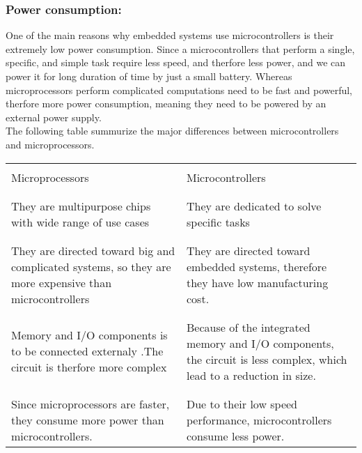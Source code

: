 \documentclass[12pt]{article}
\begin{document}
\subsubsection{Power consumption:}
One of the main reasons why embedded systems use microcontrollers is their extremely low power consumption. Since a microcontrollers that perform a single, specific, and simple task require less speed, and therfore less power, and we can power it for long duration of time by just a small battery.
Whereas microprocessors perform complicated computations need to be fast and powerful, therfore more power consumption, meaning they need to be powered by an external power supply.\\
The following table summurize the major differences between microcontrollers and microprocessors.
\begin{table}[ht]
    \centering
    \begin{tabular}{|p{0.5\linewidth}|p{0.5\linewidth}|}
        \hline
        \\[0.06em]
        Microprocessors                                                                                        & Microcontrollers                                                                                                     \\
        \\[0.06em]
        \hline
        \hline
        \\[0.06em]
        They are multipurpose chips with wide range of use cases                                               & They are dedicated to solve specific tasks                                                                           \\
        \\[0.06em]
        \hline
        \\[0.06em]
        They are directed toward big and complicated systems, so they are more expensive than microcontrollers & They are directed toward embedded systems, therefore they have low manufacturing cost.                               \\
        \\[0.06em]
        \hline
        \\[0.06em]
        Memory and I/O components is to be connected externaly .The circuit is therfore more complex           & Because of the integrated memory and I/O components, the circuit is less complex, which lead to a reduction in size. \\
        \\[0.06em]
        \hline
        \\[0.06em]
        Since microprocessors are faster, they consume more power than microcontrollers.                       & Due to their low speed performance, microcontrollers consume less power.
        \\[0.06em]
        \hline
    \end{tabular}
\end{table}
\end{document}

